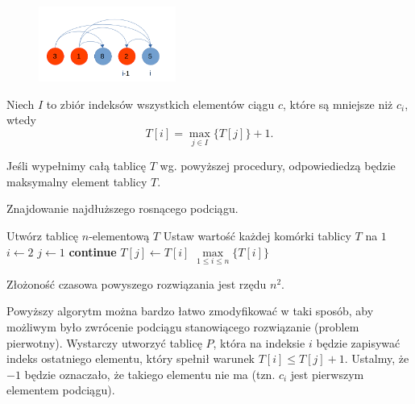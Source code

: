 \begin{figure}[H]
	\centering
	\includegraphics[width=0.4\textwidth]{data/prblm1_ex_graph2.png}
	\caption{  }
	\label{fig:example112_max_length}
\end{figure}

Niech $I$ to zbiór indeksów wszystkich elementów ciągu $c$, które są 
mniejsze niż $c_i$, wtedy 
\[T[i]=\max\limits_{j \in I}\{T[j]\} + 1.\]

Jeśli wypełnimy całą tablicę $T$ wg. powyższej procedury, odpowiediedzą
będzie maksymalny element tablicy $T$.

\begin{algorithm}[H]
	\caption{Znajdowanie najdłuższego rosnącego podciągu.}\label{MaxIncreasingSubseqenceLength}
	\begin{algorithmic}[1]
		\State Utwórz tablicę $n$-elementową $T$
		\State Ustaw wartość każdej komórki tablicy $T$ na $1$
		\State $i \gets 2$
		\State $j \gets 1$
		\textbf{continue}
		\EndIf
		\State $T[j] \gets T[i]$
		\EndIf
		\EndWhile
		\EndWhile
		\State \Return $\max\limits_{1 \leq i \leq n}\{T[i]\}$
		\EndProcedure
	\end{algorithmic}
\end{algorithm}

Złożoność czasowa powyszego rozwiązania jest rzędu $n^2$. 

Powyższy algorytm można bardzo łatwo zmodyfikować w taki sposób, aby
możliwym było zwrócenie podciągu stanowiącego rozwiązanie (problem pierwotny).
Wystarczy utworzyć tablicę $P$, która na indeksie $i$
będzie zapisywać indeks ostatniego elementu, który spełnił 
warunek $T[i] \leq T[j] + 1$. Ustalmy, że $-1$ będzie oznaczało, że 
takiego elementu nie ma (tzn. $c_i$ jest pierwszym elementem podciągu).

